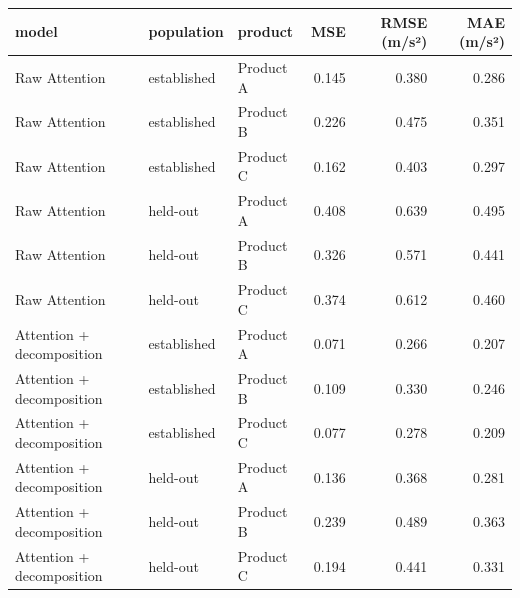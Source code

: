 \begin{tabular}{lllrrr}
\toprule
model & population & product & MSE & RMSE (m/s²) & MAE (m/s²) \\
\midrule
Raw Attention & established & Product A & 0.145 & 0.380 & 0.286 \\
Raw Attention & established & Product B & 0.226 & 0.475 & 0.351 \\
Raw Attention & established & Product C & 0.162 & 0.403 & 0.297 \\
Raw Attention & held-out & Product A & 0.408 & 0.639 & 0.495 \\
Raw Attention & held-out & Product B & 0.326 & 0.571 & 0.441 \\
Raw Attention & held-out & Product C & 0.374 & 0.612 & 0.460 \\
Attention + decomposition & established & Product A & 0.071 & 0.266 & 0.207 \\
Attention + decomposition & established & Product B & 0.109 & 0.330 & 0.246 \\
Attention + decomposition & established & Product C & 0.077 & 0.278 & 0.209 \\
Attention + decomposition & held-out & Product A & 0.136 & 0.368 & 0.281 \\
Attention + decomposition & held-out & Product B & 0.239 & 0.489 & 0.363 \\
Attention + decomposition & held-out & Product C & 0.194 & 0.441 & 0.331 \\
\bottomrule
\end{tabular}
